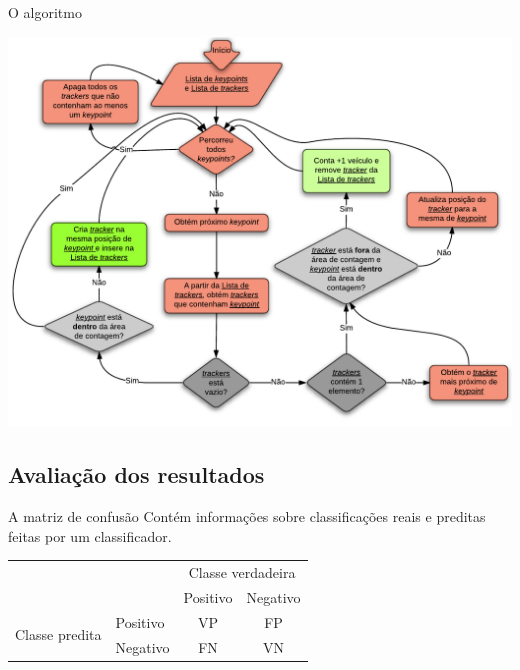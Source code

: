 \begin{frame}{O algoritmo}
  \begin{center}
    \includegraphics[scale=0.44]{imgs/fluxograma_contagem.pdf}
  \end{center}
\end{frame}


\subsection{Avaliação dos resultados} %
\label{sub:avalia_o_dos_resultados}

\begin{frame}{A matriz de confusão}
  Contém informações sobre classificações reais e preditas feitas por um classificador.

  \begin{center}
    \begin{tabular}{l|l|c|c|}

    \multicolumn{2}{c}{} & \multicolumn{2}{c}{Classe verdadeira} \\
    \cline{3-4}
    \multicolumn{2}{c|}{} & Positivo & Negativo \\
    \cline{2-4}
    \multirow{2}{*}{Classe predita} & Positivo & VP & FP \\
    \cline{2-4}
    & Negativo & FN & VN \\
    \cline{2-4}
    
    \end{tabular}
  \end{center}
\end{frame}

